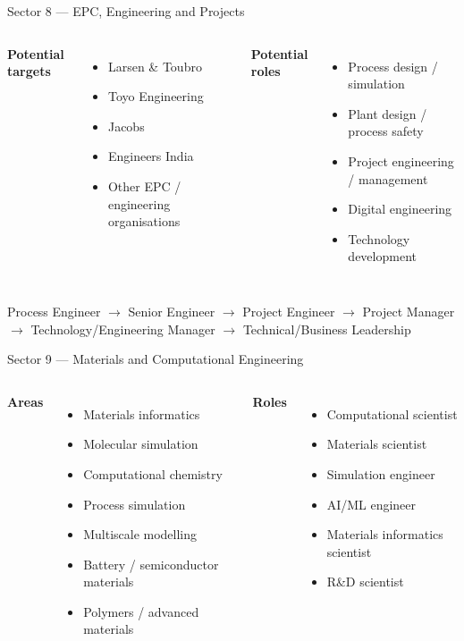 \documentclass[aspectratio=169,11pt]{beamer}
\begin{document}
\begin{frame}{Sector 8 — EPC, Engineering and Projects}
\begin{columns}[T]
\textbf{Potential targets}
\begin{itemize}
\item Larsen \& Toubro
\item Toyo Engineering
\item Jacobs
\item Engineers India
\item Other EPC / engineering organisations
\end{itemize}
\textbf{Potential roles}
\begin{itemize}
\item Process design / simulation
\item Plant design / process safety
\item Project engineering / management
\item Digital engineering
\item Technology development
\end{itemize}
\end{columns}
\vspace{5mm}
\begin{center}
\small Process Engineer $\rightarrow$ Senior Engineer $\rightarrow$ Project Engineer $\rightarrow$ Project Manager $\rightarrow$ Technology/Engineering Manager $\rightarrow$ Technical/Business Leadership
\end{center}
\end{frame}

\begin{frame}{Sector 9 — Materials and Computational Engineering}
\begin{columns}[T]
\textbf{Areas}
\begin{itemize}
\item Materials informatics
\item Molecular simulation
\item Computational chemistry
\item Process simulation
\item Multiscale modelling
\item Battery / semiconductor materials
\item Polymers / advanced materials
\end{itemize}
\textbf{Roles}
\begin{itemize}
\item Computational scientist
\item Materials scientist
\item Simulation engineer
\item AI/ML engineer
\item Materials informatics scientist
\item R\&D scientist
\end{itemize}
\end{columns}
\end{frame}
\end{document}
